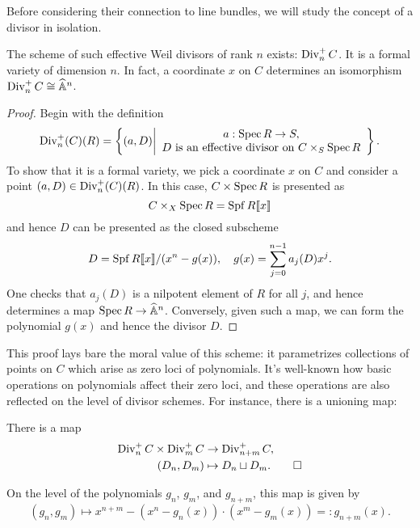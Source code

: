 Before considering their connection to line bundles, we will study the concept of a divisor in isolation.

\begin{lemma}
The scheme of such effective Weil divisors of rank $n$ exists: $\operatorname{Div}_n^+ C$.  It is a formal variety of dimension $n$.  In fact, a coordinate $x$ on $C$ determines an isomorphism $\operatorname{Div}_n^+ C \cong \widehat{\mathbb{A}}^n$.
\end{lemma}
\begin{proof}
Begin with the definition \[\operatorname{Div}_n^+(C)(R) = \left\{(a, D) \middle| \begin{array}{c} a: \operatorname{Spec} R \to S, \\ \text{$D$ is an effective divisor on $C \times_S \operatorname{Spec} R$} \end{array} \right\}.\]  To show that it is a formal variety, we pick a coordinate $x$ on $C$ and consider a point $(a, D) \in \operatorname{Div}_n^+(C)(R)$.  In this case, $C \times \operatorname{Spec} R$ is presented as \[C \times_X \operatorname{Spec} R = \operatorname{Spf} R\llbracket x \rrbracket\] and hence $D$ can be presented as the closed subscheme \[D = \operatorname{Spf} R\llbracket x \rrbracket / (x^n - g(x)), \quad g(x) = \sum_{j=0}^{n-1} a_j(D) x^j.\]  One checks that $a_j(D)$ is a nilpotent element of $R$ for all $j$, and hence determines a map $\operatorname{Spec} R \to \widehat{\mathbb{A}}^n$.  Conversely, given such a map, we can form the polynomial $g(x)$ and hence the divisor $D$.
\end{proof}

This proof lays bare the moral value of this scheme: it parametrizes collections of points on $C$ which arise as zero loci of polynomials.  It's well-known how basic operations on polynomials affect their zero loci, and these operations are also reflected on the level of divisor schemes.  For instance, there is a unioning map:
\begin{lemma}
There is a map
\begin{align*}
\operatorname{Div}_n^+ C \times \operatorname{Div}_m^+ C & \to \operatorname{Div}_{n+m}^+ C, \\
(D_n, D_m) & \mapsto D_n \sqcup D_m. \qed
\end{align*}
\end{lemma}
\begin{remark}\label{DescriptionOfSqCupMapOnPolynomials}
On the level of the polynomials $g_n$, $g_m$, and $g_{n+m}$, this map is given by \[(g_n, g_m) \mapsto x^{n+m} - (x^n - g_n(x)) \cdot (x^m - g_m(x)) =: g_{n+m}(x).\] 
\end{remark}

